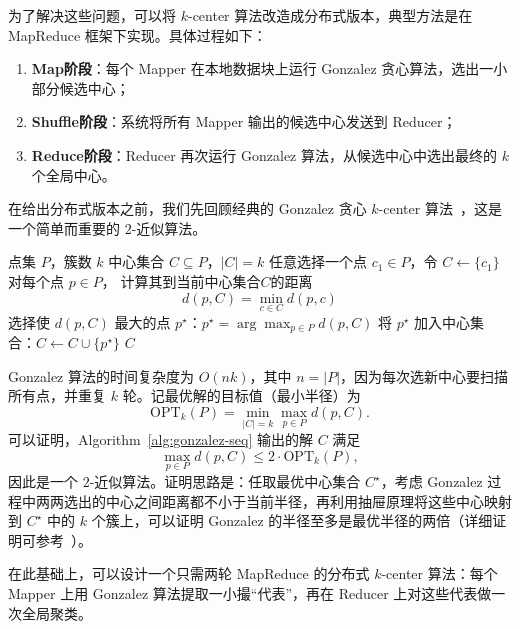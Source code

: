\documentclass[lang=cn,newtx,10pt,scheme=chinese,chinesefont=nofont,citestyle=gb7714-2015, bibstyle=gb7714-2015]{elegantbook}
\begin{document}
\begin{refsection}
为了解决这些问题，可以将 $k$-center 算法改造成分布式版本，典型方法是在 MapReduce 框架下实现。具体过程如下：
\begin{enumerate}
    \item \textbf{Map阶段}：每个 Mapper 在本地数据块上运行 Gonzalez 贪心算法，选出一小部分候选中心；
    \item \textbf{Shuffle阶段}：系统将所有 Mapper 输出的候选中心发送到 Reducer；
    \item \textbf{Reduce阶段}：Reducer 再次运行 Gonzalez 算法，从候选中心中选出最终的 $k$ 个全局中心。
\end{enumerate}

在给出分布式版本之前，我们先回顾经典的 Gonzalez 贪心 $k$-center 算法~\cite{gonzalez1985clustering}，这是一个简单而重要的 $2$-近似算法。

\begin{algorithm}[htbp]
  \caption{Gonzalez  $k$-center 算法~\cite{gonzalez1985clustering}}
  \label{alg:gonzalez-seq}
  \renewcommand{\algorithmicrequire}{\textbf{Input:}}%
    \renewcommand{\algorithmicensure}{\textbf{Output:}}%
  \begin{algorithmic}[1]
    \Require 点集 $P$，簇数 $k$
    \Ensure 中心集合 $C \subseteq P$，$|C| = k$
    \State 任意选择一个点 $c_1 \in P$，令 $C \gets \{c_1\}$
      \State 对每个点 $p \in P$， 计算其到当前中心集合$C$的距离
      \[
        d(p, C) = \min_{c \in C} d(p, c)
      \]
      \State 选择使 $d(p,C)$ 最大的点 $p^\star$：$p^\star = \arg\max_{p \in P} d(p, C)$
      \State 将 $p^\star$ 加入中心集合：$C \gets C \cup \{p^\star\}$
    \EndFor
    \State \Return $C$
  \end{algorithmic}
\end{algorithm}

\noindent
Gonzalez 算法的时间复杂度为 $O(nk)$，其中 $n = |P|$，因为每次选新中心要扫描所有点，并重复 $k$ 轮。记最优解的目标值（最小半径）为
\[
  \text{OPT}_k(P) = \min_{|C|=k} \max_{p \in P} d(p,C).
\]
可以证明，Algorithm~\ref{alg:gonzalez-seq} 输出的解 $C$ 满足
\[
  \max_{p \in P} d(p,C) \le 2 \cdot \text{OPT}_k(P),
\]
因此是一个 $2$-近似算法。证明思路是：任取最优中心集合 $C^\star$，考虑 Gonzalez 过程中两两选出的中心之间距离都不小于当前半径，再利用抽屉原理将这些中心映射到 $C^\star$ 中的 $k$ 个簇上，可以证明 Gonzalez 的半径至多是最优半径的两倍（详细证明可参考~\cite{gonzalez1985clustering}）。

在此基础上，可以设计一个只需两轮 MapReduce 的分布式 $k$-center 算法：每个 Mapper 上用 Gonzalez 算法提取一小撮“代表”，再在 Reducer 上对这些代表做一次全局聚类。


\end{refsection}
\end{document}
